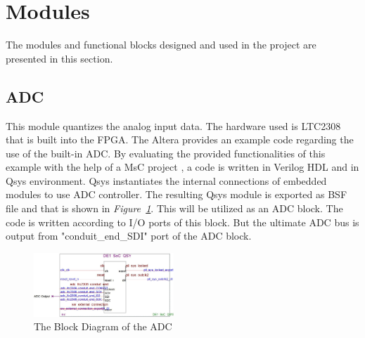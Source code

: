 \documentclass[paper]{IEEEtran}
\begin{document}
\section{Modules}
The modules and functional blocks designed and used in the project are presented in this section.

\subsection{ADC} \- \indent
		This module quantizes the analog input data. The hardware used is LTC2308 that is built into the FPGA. The Altera provides an example code regarding the use of the built-in ADC\cite{b1}. By evaluating the provided functionalities of this example with the help of a MsC project \cite{b2}, a code is written in Verilog HDL and in Qsys environment. Qsys instantiates the internal connections of embedded modules to use ADC controller. The resulting Qsys module is exported as BSF file and that is shown in \textit{Figure~\ref{fig:adc_block}}. This will be utilized as an ADC block. The code is written according to I/O ports of this block. But the ultimate ADC bus is output from "conduit\_end\_SDI" port of the ADC block.
		
		\begin{figure}[t!]
			\setlength{\unitlength}{\textwidth}
			\center 
			\includegraphics[width=0.47\textwidth]{adc_block}
			\caption{\label{fig:adc_block}The Block Diagram of the ADC}
		\end{figure}
\end{document}

